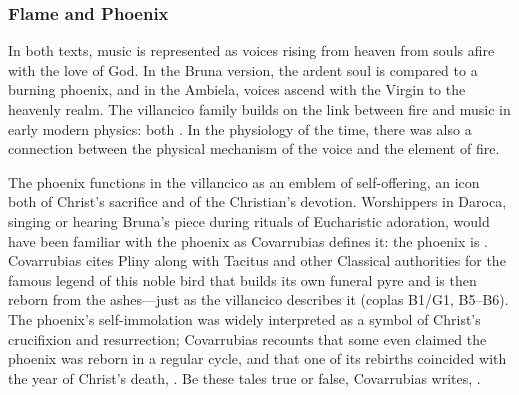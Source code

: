 \subsubsection{Flame and Phoenix}

In both texts, music is represented as voices rising from heaven from souls
afire with the love of God.
In the Bruna version, the ardent soul is compared to a burning phoenix, and in
the Ambiela, voices ascend with the Virgin to the heavenly realm.
The villancico family builds on the link between fire and music in early modern
physics: both .
In the physiology of the time, there was also a connection between the physical
mechanism of the voice and the element of fire.

The phoenix functions in the villancico as an emblem of self-offering, an icon
both of Christ's sacrifice and of the Christian's devotion.
Worshippers in Daroca, singing or hearing Bruna's piece during rituals of
Eucharistic adoration, would have been familiar with the phoenix as Covarrubias
defines it: the phoenix is .%
    \Autocite[400, ]{Covarrubias:Tesoro}
Covarrubias cites Pliny along with Tacitus and other Classical authorities for
the famous legend of this noble bird that builds its own funeral pyre and is
then reborn from the ashes---just as the villancico describes it (coplas B1/G1,
B5--B6).
The phoenix's self-immolation was widely interpreted as a symbol of Christ's
crucifixion and resurrection; Covarrubias recounts that some even claimed the
phoenix was reborn in a regular cycle, and that one of its rebirths coincided
with the year of Christ's death, .
Be these tales true or false, Covarrubias writes, .%
    \Autocite[400, ]{Covarrubias:Tesoro}


